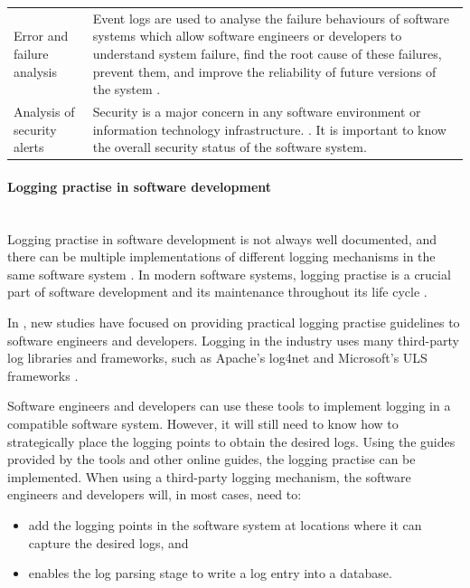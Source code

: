\begin{xltabular}{\textwidth}{p{3cm}X}
	Error and failure analysis & \RaggedRight Event logs are used to analyse the failure behaviours of software systems which allow software engineers or developers to understand system failure, find the root cause of these failures, prevent them, and improve the reliability of future versions of the system \cite{Cinque2013}.\\


	Analysis of security alerts & \RaggedRight Security is a major concern in any software environment or information technology infrastructure. \cite{Pathan2014, Dwyer2013}. It is important to know the overall security status of the software system. \\
	\bottomrule
\end{xltabular}

\paragraph{Logging practise in software development}\label{sec:ch1_loggingPractice}\leavevmode\\
Logging practise in software development is not always well documented, and there can be multiple implementations of different logging mechanisms in the same software system \cite{Pecchia2015, Kitchenham2007}. In modern software systems, logging practise is a crucial part of software development and its maintenance throughout its life cycle \cite{Rong2018}.\par In , new studies have focused on providing practical logging practise guidelines to software engineers and developers. Logging in the industry uses many third-party log libraries and frameworks, such as Apache's log4net and Microsoft's ULS frameworks \cite{Zhu2015, Rong2018}.\par Software engineers and developers can use these tools to implement logging in a compatible software system. However, it will still need to know how to strategically place the logging points to obtain the desired logs. Using the guides provided by the tools and other online guides, the logging practise can be implemented. When using a third-party logging mechanism, the software engineers and developers will, in most cases, need to:

\begin{itemize}
	\item add the logging points in the software system at locations where it can capture the desired logs, and
	\item enables the log parsing stage to write a log entry into a database.
\end{itemize}

